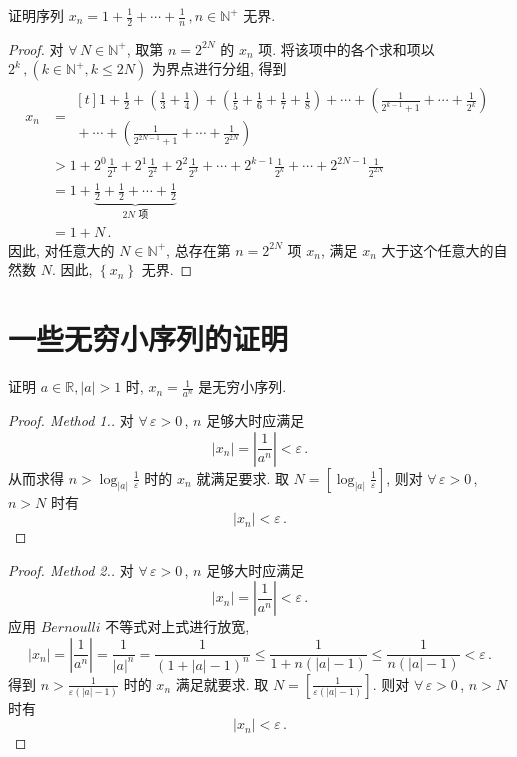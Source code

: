 \documentclass{book}
\newcommand{\Any}{\forall\,}
\newcommand{\set}[1]{\left\{#1\right\}}
\newcommand{\abs}[1]{\left\lvert #1 \right\rvert}
\newcommand{\R}{\mathbb{R}}
\newcommand{\N}{\mathbb{N}}
\renewcommand{\le}{\leqslant}
\numberwithin{equation}{section}
\numberwithin{figure}{section}
\theoremstyle{definition}
\begin{document}
证明序列 $x_n=1+\frac{1}{2}+\cdots+\frac{1}{n}\,,n\in\N^+$ 无界.
\begin{proof}
  对 $\Any N\in\N^+$, 取第 $n=2^{2N}$ 的 $x_n$ 项. 将该项中的各个求和项以 $2^k\,,(k\in\N^+,k\le2N)$ 为界点进行分组, 得到
  \begin{align*}
    x_n&=
    \begin{multlined}[t]
      1+\frac{1}{2}+\left( \frac{1}{3}+\frac{1}{4} \right)+\left( \frac{1}{5}+\frac{1}{6}+\frac{1}{7}+\frac{1}{8} \right)+\cdots+\left( \frac{1}{2^{k-1}+1}+\cdots+\frac{1}{2^k} \right)\\
      {}+\cdots+\left( \frac{1}{2^{2N-1}+1}+\cdots+\frac{1}{2^{2N}} \right)
    \end{multlined}\\
    &>1+2^0\frac{1}{2^1}+2^1\frac{1}{2^2}+2^2\frac{1}{2^3}+\cdots+2^{k-1}\frac{1}{2^k}+\cdots+2^{2N-1}\frac{1}{2^{2N}}\\
    &=1+\underbrace{\frac{1}{2}+\frac{1}{2}+\cdots+\frac{1}{2}}_{2N\text{ 项}}\\
    &=1+N\,.
  \end{align*}
  因此, 对任意大的 $N\in\N^+$, 总存在第 $n=2^{2N}$ 项 $x_n$, 满足 $x_n$ 大于这个任意大的自然数 $N$. 因此, $\set{x_n}$ 无界.
\end{proof}

\section{一些无穷小序列的证明}
\label{proof:infinitesimalsequence}
证明 $a\in\R,\abs{a}>1$ 时, $x_n=\frac{1}{a^n}$ 是无穷小序列.
\begin{proof}[Proof. Method 1.]
  对 $\Any \varepsilon>0$\,, $n$ 足够大时应满足
  \begin{equation*}
    \abs{x_n}=\abs{\frac{1}{a^n}}<\varepsilon\,.
  \end{equation*}
  从而求得 $n>\log_{\abs{a}}\frac{1}{\varepsilon}$ 时的 $x_n$ 就满足要求.
  取 $N=\left[ \log_{\abs{a}}\frac{1}{\varepsilon} \right]$, 则对 $\Any \varepsilon>0$\,, $n>N$ 时有
  \begin{equation*}
    \abs{x_n}<\varepsilon\,.
  \end{equation*}
\end{proof}
\begin{proof}[Proof. Method 2.]
  对 $\Any \varepsilon>0$\,, $n$ 足够大时应满足
  \begin{equation*}
    \abs{x_n}=\abs{\frac{1}{a^n}}<\varepsilon\,.
  \end{equation*}
  应用 $Bernoulli$ 不等式对上式进行放宽,
  \begin{equation*}
    \abs{x_n}=\abs{\frac{1}{a^n}}=\frac{1}{\abs{a}^n}=\frac{1}{\left( 1+\abs{a}-1 \right)^n}\le\frac{1}{1+n\left( \abs{a}-1 \right)}\le\frac{1}{n\left( \abs{a}-1 \right)}<\varepsilon\,.
  \end{equation*}
  得到 $n>\frac{1}{\varepsilon\left( \abs{a}-1 \right)}$ 时的 $x_n$ 满足就要求.
  取 $N=\left[ \frac{1}{\varepsilon\left( \abs{a}-1 \right)} \right]$. 则对 $\Any \varepsilon>0$\,, $n>N$ 时有
  \begin{equation*}
    \abs{x_n}<\varepsilon\,.
  \end{equation*}
\end{proof}
\end{document}
